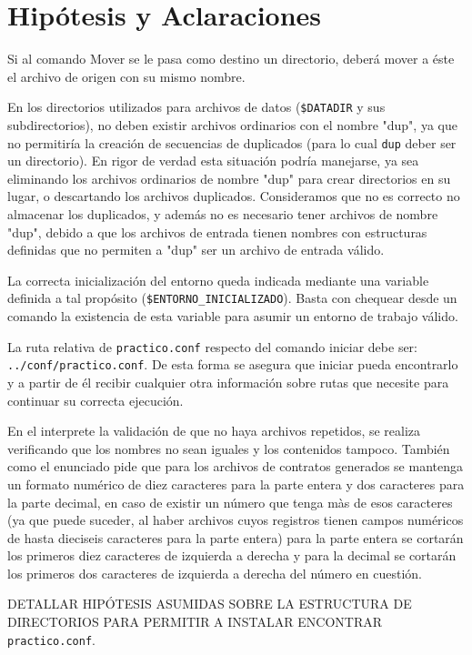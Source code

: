 \documentclass[12pt]{article}
\begin{document}
\tableofcontents
\clearpage

\section{Hipótesis y Aclaraciones}

Si al comando Mover se le pasa como destino un directorio, deberá mover a éste el archivo de origen con su mismo nombre.

En los directorios utilizados para archivos de datos (\verb|$DATADIR| y sus subdirectorios), no deben existir archivos ordinarios con el nombre "dup", ya que no permitiría la creación de secuencias de duplicados (para lo cual \verb|dup| deber ser un directorio). En rigor de verdad esta situación podrí­a manejarse, ya sea eliminando los archivos ordinarios de nombre "dup" para crear directorios en su lugar, o descartando los archivos duplicados. Consideramos que no es correcto no almacenar los duplicados, y además no es necesario tener archivos de nombre "dup", debido a que los archivos de entrada tienen nombres con estructuras definidas que no permiten a "dup" ser un archivo de entrada válido.

La correcta inicialización del entorno queda indicada mediante una variable definida a tal propósito (\verb|$ENTORNO_INICIALIZADO|). Basta con chequear desde un comando la existencia de esta variable para asumir un entorno de trabajo válido.

La ruta relativa de \verb|practico.conf| respecto del comando iniciar debe ser: \verb|../conf/practico.conf|. De esta forma se asegura que iniciar pueda encontrarlo y a partir de él recibir cualquier otra información sobre rutas que necesite para continuar su correcta ejecución.

En el interprete la validación de que no haya archivos repetidos, se realiza verificando que los nombres no sean iguales y los contenidos tampoco. También como el enunciado pide que para los archivos de contratos generados se mantenga un formato numérico de diez caracteres para la parte entera y dos caracteres para la parte decimal, en caso de existir un número que tenga màs de esos caracteres (ya que puede suceder, al haber archivos cuyos registros tienen campos numéricos de hasta dieciseis caracteres para la parte entera) para la parte entera se cortarán los primeros diez caracteres de izquierda a derecha y para la decimal se cortarán los primeros dos caracteres de izquierda a derecha del número en cuestión.

DETALLAR HIPÓTESIS ASUMIDAS SOBRE LA ESTRUCTURA DE DIRECTORIOS PARA PERMITIR A INSTALAR ENCONTRAR \verb|practico.conf|.
\end{document}
